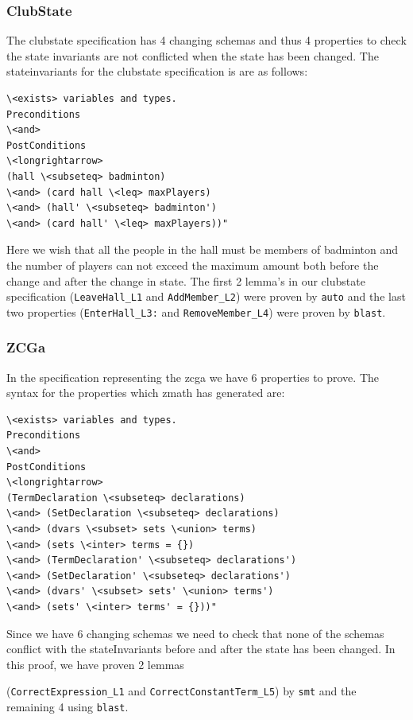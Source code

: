 \subsubsection{ClubState}

The clubstate specification has 4 changing schemas and thus 4 properties to
check the state invariants are not conflicted when the state has been changed.
The stateinvariants for the clubstate specification is are as follows:

\begin{verbatim}
\<exists> variables and types.
Preconditions
\<and>
PostConditions
\<longrightarrow>
(hall \<subseteq> badminton) 
\<and> (card hall \<leq> maxPlayers)
\<and> (hall' \<subseteq> badminton') 
\<and> (card hall' \<leq> maxPlayers))"
\end{verbatim}

Here we wish that all the people in the hall must be members of badminton and
the number of players can not exceed the maximum amount both before the change
and after the change in state. The first 2 lemma's in our clubstate
specification (\verb|LeaveHall_L1| and \verb|AddMember_L2|) were proven by
\verb|auto| and the last two properties (\verb|EnterHall_L3:| and
\verb|RemoveMember_L4|) were proven by \verb|blast|.

\subsubsection{ZCGa}

In the specification representing the \gls{zcga} we have 6 properties to prove.
The syntax for the properties which \gls{zmath} has generated are:

\begin{verbatim}
\<exists> variables and types.
Preconditions
\<and>
PostConditions
\<longrightarrow>
(TermDeclaration \<subseteq> declarations)
\<and> (SetDeclaration \<subseteq> declarations)
\<and> (dvars \<subset> sets \<union> terms)
\<and> (sets \<inter> terms = {})
\<and> (TermDeclaration' \<subseteq> declarations')
\<and> (SetDeclaration' \<subseteq> declarations')
\<and> (dvars' \<subset> sets' \<union> terms')
\<and> (sets' \<inter> terms' = {}))"
\end{verbatim}

Since we have 6 changing schemas we need to check that none of the schemas
conflict with the stateInvariants before and after the state has been changed.
In this proof, we have proven 2 lemmas

(\verb|CorrectExpression_L1| and \verb|CorrectConstantTerm_L5|) by \verb|smt|
and the remaining 4 using \verb|blast|.

